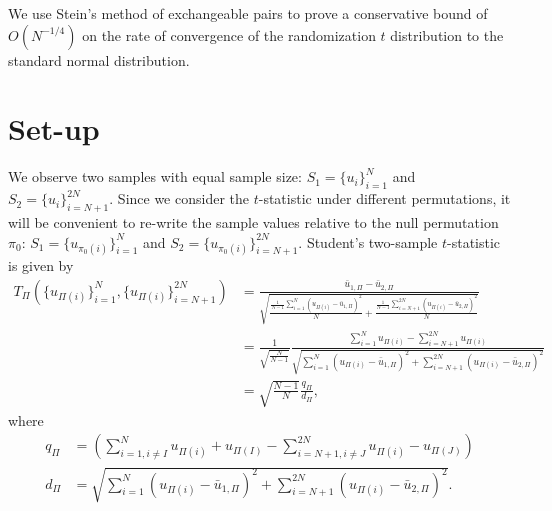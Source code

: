 We use Stein's method of exchangeable pairs to prove a conservative bound of $O(N^{-1/4})$ on the
rate of convergence of the randomization $t$ distribution to the standard normal distribution.

\section{Set-up}
We observe two samples with equal sample size: $S_1 = \{u_i\}_{i=1}^N$ and $S_2 =
\{u_i\}_{i=N+1}^{2N}$.  Since we consider the $t$-statistic under different permutations, it will be
convenient to re-write the sample values relative to the null permutation $\pi_0$: $S_1 =
\{u_{\pi_0(i)}\}_{i=1}^N$ and $S_2 = \{u_{\pi_0(i)}\}_{i=N+1}^{2N}$.
Student's two-sample $t$-statistic is given by
\begin{align*}
T_{\Pi}(\{u_{\Pi(i)}\}_{i=1}^N, \{u_{\Pi(i)}\}_{i=N+1}^{2N}) 
&= \frac{\bar{u}_{1,\Pi} - \bar{u}_{2,\Pi}}{\sqrt{\frac{\frac{1}{N-1}
      \sum_{i=1}^N(u_{\Pi(i)} - \bar{u}_{1,\Pi})^2}{N} + \frac{\frac{1}{N-1}
      \sum_{i=N+1}^{2N}(u_{\Pi(i)} - \bar{u}_{2,\Pi})^2}{N}}} \\
&= \frac{1}{\sqrt{\frac{N}{N-1}}} \frac{\sum_{i=1}^N u_{\Pi(i)} -
  \sum_{i=N+1}^{2N}u_{\Pi(i)}}{\sqrt{\sum_{i=1}^N(u_{\Pi(i)} - 
    \bar{u}_{1,\Pi})^2 + \sum_{i=N+1}^{2N}(u_{\Pi(i)} - \bar{u}_{2,\Pi})^2}} \\
&= \sqrt{\frac{N-1}{N}}\frac{q_\Pi}{d_\Pi},
\end{align*}
where
\begin{align*}
  q_\Pi &= \left (\sum_{i=1, i\neq I}^N u_{\Pi(i)} + u_{\Pi(I)} -
    \sum_{i=N+1, i\neq J}^{2N}u_{\Pi(i)} - u_{\Pi(J)}\right ) \\
  d_\Pi &= \sqrt{\sum_{i=1}^N(u_{\Pi(i)} - \bar{u}_{1,\Pi})^2 +
    \sum_{i=N+1}^{2N}(u_{\Pi(i)} - \bar{u}_{2,\Pi})^2}.
\end{align*}

